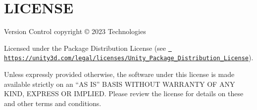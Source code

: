 \chapter{LICENSE}
\hypertarget{md__library_2_package_cache_2com_8unity_8collab-proxy_0d2_83_81_2_l_i_c_e_n_s_e}{}\label{md__library_2_package_cache_2com_8unity_8collab-proxy_0d2_83_81_2_l_i_c_e_n_s_e}
Version Control copyright © 2023  Technologies

Licensed under the  Package Distribution License (see \href{https://unity3d.com/legal/licenses/Unity_Package_Distribution_License}{\texttt{ https\+://unity3d.\+com/legal/licenses/\+Unity\+\_\+\+Package\+\_\+\+Distribution\+\_\+\+License}}).

Unless expressly provided otherwise, the software under this license is made available strictly on an “\+AS IS” BASIS WITHOUT WARRANTY OF ANY KIND, EXPRESS OR IMPLIED. Please review the license for details on these and other terms and conditions. 